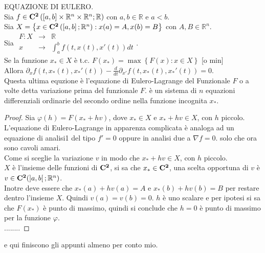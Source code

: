 \theorem EQUAZIONE DI EULERO.\\
Sia $f\in \mathbf{C^{2}}\left(\left[a,b\right]\times\mathbb{R}^n\times\mathbb{R}^n;\mathbb{R}\right)$ con $a,b\in\mathbb{R}$ e $a<b$.\\
Sia $X=\left\{x\in \mathbf{C^{2}}\left(\left[a,b\right];\mathbb{R}^n\right): x(a)=A, x(b)=B\right\}$ con $A,B\in\mathbb{R}^n$.\\
Sia $\begin{array}{ccc} F: X & \to & \mathbb{R} \\
x & \to & \int_{a}^b f(t,x(t), x'(t))dt\end{array}$.\\
Se la funzione $x_\ast\in X$ è t.c. $F(x_\ast)=\max\left\{F(x):x\in X \right\}$ [o min]\\
Allora $\partial_xf(t,x_\ast(t), x_\ast'(t))-\frac{d}{dt}\partial_{ x'}f(t,x_\ast(t), x_\ast'(t))=0$.\\
Questa ultima equzione è l'equazione di Eulero-Lagrange del Funzionale $F$ o a volte detta variazione prima del funzionale $F$. è un sistema di $n$ equazioni differenziali ordinarie del secondo ordine nella funzione incognita $x_\ast$.
\begin{proof}
	 Sia $\varphi(h)=F(x_\ast+hv)$, dove $x_\ast\in X$ e $x_\ast+hv\in X$, con $h$ piccolo.\\
	 L'equazione di Eulero-Lagrange in apparenza complicata è analoga ad un equazione di analisi1 del tipo $f'=0$ oppure in analisi due a $\nabla f=0$. solo che ora sono cavoli amari.\\
	 Come si sceglie la variazione $v$ in modo che $x_\ast+hv\in X$, con $h$ piccolo.\\
	 $X$ è l'insieme delle funzioni di $\mathbf{C^{2}}$, si sa che $x_\ast\in \mathbf{C^{2}}$, una scelta opportuna di $v$ è $v\in \mathbf{C^{2}}(\left]a,b\right[;\mathbb{R}^n)$.\\
	 Inotre deve essere che $ x_\ast(a)+hv(a)=A$ e  $x_\ast(b)+hv(b)=B$ per restare dentro l'insieme $X$.
	 Quindi $v(a)=v(b)=0$.
	 $h$ è uno scalare e per ipotesi si sa che $F(x_\ast)$ è punto di massimo, quindi si conclude che $h=0$ è punto di massimo per la funzione $\varphi$.\\
	 ........ 
\end{proof}
e qui finiscono gli appunti almeno per conto mio.


